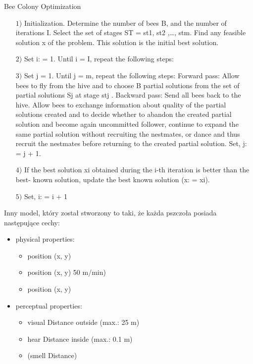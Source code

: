 \documentclass[11pt]{aghdpl}
\begin{document}
\begin{enumerate}
Bee Colony Optimization
\begin{enumerate}
        \item[$1)$] Initialization. Determine the number of bees B, and the number of iterations I. Select the set of stages ST = {st1, st2 ,…, stm}. Find any feasible solution x of the problem. This solution is the initial best solution.
        \item[$2)$] Set i: = 1. Until i = I, repeat the following steps:
        \item[$3)$] Set j = 1. Until j = m, repeat the following steps:
                Forward pass: Allow bees to fly from the hive and to choose B partial solutions from the set of partial solutions Sj at stage stj .
                Backward pass: Send all bees back to the hive.
                Allow bees to exchange information about quality of the partial solutions created and to decide whether to abandon the created partial solution and become again uncommitted follower, continue to expand the same partial solution without recruiting the nestmates, or dance and thus recruit the nestmates before returning to the created partial solution. Set, j: = j + 1.
        \item[$4)$] If the best solution xi obtained during the i-th iteration is better than the best- known solution, update the best known solution (x: = xi).
        \item[$5)$] Set, i: = i + 1
\end{enumerate}

Inny model, który został stworzony to taki, że każda pszczoła posiada następujące cechy:
\begin{itemize}
\item physical properties:
        \begin{itemize}
                \item position (x, y)
                \item position (x, y) 50 m/min)
                \item position (x, y)
        \end{itemize}
\item perceptual properties:
        \begin{itemize}
                \item visual Distance outside (max.: 25 m)
                \item hear Distance inside (max.: 0.1 m)
                \item (smell Distance)
        \end{itemize}


\end{itemize}
\end{enumerate}
\end{document}
